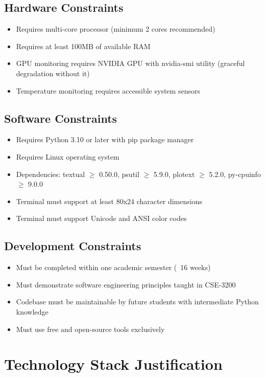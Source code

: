 \documentclass[12pt,a4paper,oneside]{report}
\begin{document}
\subsection{Hardware Constraints}
\begin{itemize}
    \item Requires multi-core processor (minimum 2 cores recommended)
    \item Requires at least 100MB of available RAM
    \item GPU monitoring requires NVIDIA GPU with nvidia-smi utility (graceful degradation without it)
    \item Temperature monitoring requires accessible system sensors
\end{itemize}

\subsection{Software Constraints}
\begin{itemize}
    \item Requires Python 3.10 or later with pip package manager
    \item Requires Linux operating system
    \item Dependencies: textual $\geq$ 0.50.0, psutil $\geq$ 5.9.0, plotext $\geq$ 5.2.0, py-cpuinfo $\geq$ 9.0.0
    \item Terminal must support at least 80x24 character dimensions
    \item Terminal must support Unicode and ANSI color codes
\end{itemize}

\subsection{Development Constraints}
\begin{itemize}
    \item Must be completed within one academic semester (~16 weeks)
    \item Must demonstrate software engineering principles taught in CSE-3200
    \item Codebase must be maintainable by future students with intermediate Python knowledge
    \item Must use free and open-source tools exclusively
\end{itemize}

\section{Technology Stack Justification}
\label{sec:technology-stack}
\end{document}
